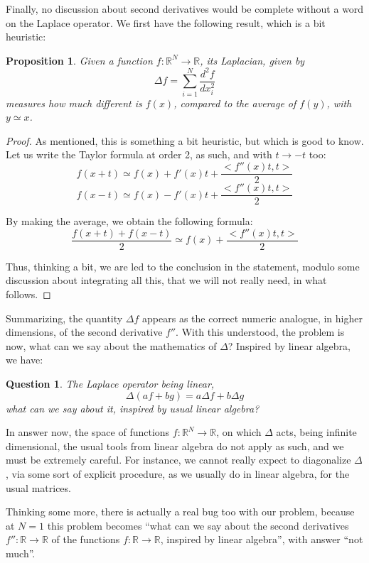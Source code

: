 \documentclass[12pt]{amsbook}
\newtheorem{proposition}[theorem]{Proposition}
\newtheorem{question}[theorem]{Question}
\begin{document}
Finally, no discussion about second derivatives would be complete without a word on the Laplace operator. We first have the following result, which is a bit heuristic:

\begin{proposition}
Given a function $f:\mathbb R^N\to\mathbb R$, its Laplacian, given by
$$\Delta f=\sum_{i=1}^N\frac{d^2f}{dx_i^2}$$
measures how much different is $f(x)$, compared to the average of $f(y)$, with $y\simeq x$.
\end{proposition}

\begin{proof}
As mentioned, this is something a bit heuristic, but which is good to know. Let us write the Taylor formula at order 2, as such, and with $t\to-t$ too:
$$f(x+t)\simeq f(x)+f'(x)t+\frac{<f''(x)t,t>}{2}$$
$$f(x-t)\simeq f(x)-f'(x)t+\frac{<f''(x)t,t>}{2}$$

By making the average, we obtain the following formula:
$$\frac{f(x+t)+f(x-t)}{2}\simeq f(x)+\frac{<f''(x)t,t>}{2}$$

Thus, thinking a bit, we are led to the conclusion in the statement, modulo some discussion about integrating all this, that we will not really need, in what follows.
\end{proof}

Summarizing, the quantity $\Delta f$ appears as the correct numeric analogue, in higher dimensions, of the second derivative $f''$. With this understood, the problem is now, what can we say about the mathematics of $\Delta$? Inspired by linear algebra, we have: 

\begin{question}
The Laplace operator being linear,
$$\Delta(af+bg)=a\Delta f+b\Delta g$$
what can we say about it, inspired by usual linear algebra?
\end{question}

In answer now, the space of functions $f:\mathbb R^N\to\mathbb R$, on which $\Delta$ acts, being infinite dimensional, the usual tools from linear algebra do not apply as such, and we must be extremely careful. For instance, we cannot really expect to diagonalize $\Delta$, via some sort of explicit procedure, as we usually do in linear algebra, for the usual matrices.

\bigskip

Thinking some more, there is actually a real bug too with our problem, because at $N=1$ this problem becomes ``what can we say about the second derivatives $f'':\mathbb R\to\mathbb R$ of the functions $f:\mathbb R\to\mathbb R$, inspired by linear algebra'', with answer ``not much''.
\end{document}
